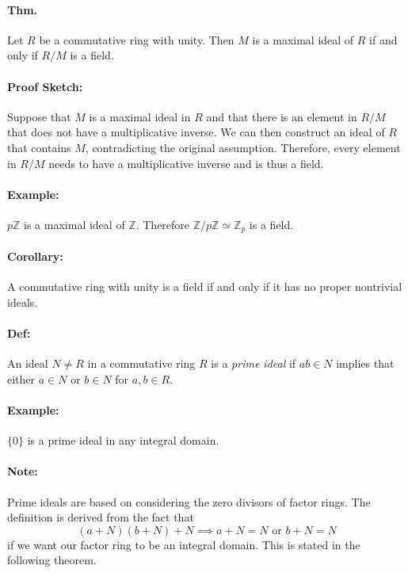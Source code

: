 \documentclass[10pt,a4paper]{article}
\begin{document}
\paragraph{Thm.} Let $R$ be a commutative ring with unity. Then $M$ is a maximal ideal of $R$ if and only if $R/M$ is a field.

\paragraph{Proof Sketch:} Suppose that $M$ is a maximal ideal in $R$ and that there is an element in $R/M$ that does not have a multiplicative inverse. We can then construct an ideal of $R$ that contains $M$, contradicting the original assumption. Therefore, every element in $R/M$ needs to have a multiplicative inverse and is thus a field.

\paragraph{Example:} $p\mathbb{Z}$ is a maximal ideal of $\mathbb{Z}$. Therefore $\mathbb{Z}/p\mathbb{Z} \simeq \mathbb{Z}_p$ is a field.

\paragraph{Corollary:} A commutative ring with unity is a field if and only if it has no proper nontrivial ideals.

\paragraph{Def:} An ideal $N \neq R$ in a commutative ring $R$ is a \textit{prime ideal} if $ab \in N$ implies that either $a \in N$ or $b \in N$ for $a,b \in R$.

\paragraph{Example:} $\{0\}$ is a prime ideal in any integral domain.

\paragraph{Note:} Prime ideals are based on considering the zero divisors of factor rings. The definition is derived from the fact that $$ (a+N)(b+N)+N \implies a+N=N \text{ or } b+N=N$$ if we want our factor ring to be an integral domain. This is stated in  the following theorem.
\end{document}
